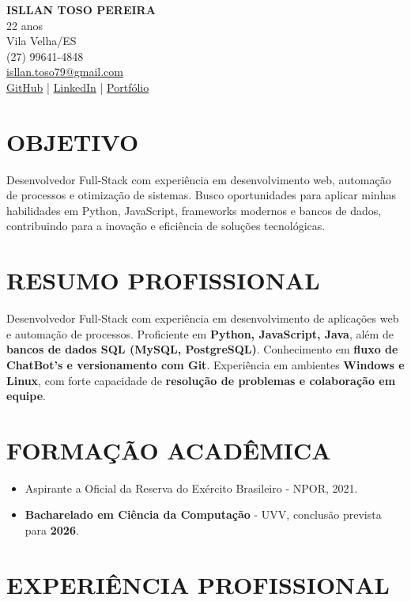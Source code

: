 \documentclass[a4paper,10pt]{article}
\begin{document}
\begin{center}
    {\LARGE \textbf{ISLLAN TOSO PEREIRA}} \\
    22 anos \\
    Vila Velha/ES \\
    (27) 99641-4848 \\
    \href{mailto:isllan.toso79@gmail.com}{isllan.toso79@gmail.com} \\
    \href{https://github.com/Isllanrx}{GitHub} | \href{http://linkedin.com/in/isllantoso}{LinkedIn} | \href{https://port-isllan.vercel.app/}{Portfólio}
\end{center} 

\section{OBJETIVO}
Desenvolvedor Full-Stack com experiência em desenvolvimento web, automação de processos e otimização de sistemas. Busco oportunidades para aplicar minhas habilidades em Python, JavaScript, frameworks modernos e bancos de dados, contribuindo para a inovação e eficiência de soluções tecnológicas.

\section{RESUMO PROFISSIONAL}
Desenvolvedor Full-Stack com experiência em desenvolvimento de aplicações web e automação de processos. Proficiente em \textbf{Python, JavaScript, Java}, além de \textbf{bancos de dados SQL (MySQL, PostgreSQL)}. Conhecimento em \textbf{fluxo de ChatBot’s e versionamento com Git}. Experiência em ambientes \textbf{Windows e Linux}, com forte capacidade de \textbf{resolução de problemas e colaboração em equipe}.

\section{FORMAÇÃO ACADÊMICA}
\begin{itemize}
    \item Aspirante a Oficial da Reserva do Exército Brasileiro - NPOR, 2021.
    \item \textbf{Bacharelado em Ciência da Computação} - UVV, conclusão prevista para \textbf{2026}.
\end{itemize}

\section{EXPERIÊNCIA PROFISSIONAL}
\end{document}
